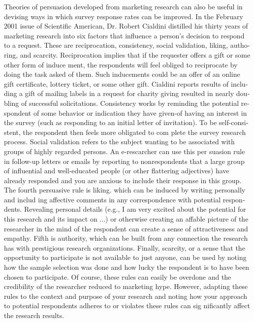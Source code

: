 \documentclass[a4 paper,12pt]{article}\usepackage{xepersian}
\begin{document}
\begin{latin}
Theories of persuasion developed from marketing research can also be useful in devising ways in which survey response rates can be improved. In the February 2001 issue of Scientific American, Dr. Robert Cialdini distilled his thirty years of marketing research into six factors that influence a person's decision to respond to a request. These are reciprocation, consistency, social validation, liking, authoring, and scarcity. Reciprocation implies that if the requester offers a gift or some other form of induce ment, the respondents will feel obliged to reciprocate by doing the task asked of them. Such inducements could be an offer of an online gift certificate, lottery ticket, or some other gift. Cialdini reports results of including a gift of mailing labels in a request for charity giving resulted in nearly doubling of successful solicitations. Consistency works by reminding the potential respondent of some behavior or indication they have given-of having an interest in the survey (such as responding to an initial letter of invitation). To be self-consistent, the respondent then feels more obligated to com plete the survey research process. Social validation refers to the subject wanting to be associated with groups of highly regarded persons. An e-rescarcher can use this per suasion rule in follow-up letters or emails by reporting to nonrespondents that a large group of influential and well-educated people (or other flattering adjectives) have already responded and you are anxious to include their response in this group. The fourth persuasive rule is liking. which can be induced by writing personally and includ ing affective comments in any correspondence with potential respondents. Revealing personal details (e.g., I am very excited about the potential for this research and its impact on ...) or otherwise creating an affable picture of the researcher in the mind of the respondent can create a sense of attractiveness and empathy. Fifth is authority, which can be built from any connection the research has with prestigious research organizations. Finally, scarcity, or a sense that the opportunity to participate is not available to just anyone, can be used by noting how the sample selection was done and how lucky the respondent is to have been chosen to participate. Of course, these rules can easily be overdone and the credibility of the researcher reduced to marketing hype. However, adapting these rules to the context and purpose of your research and noting how your approach to potential respondents adheres to or violates these rules can sig nificantly affect the research results. 

\end{latin}
\end{document}
